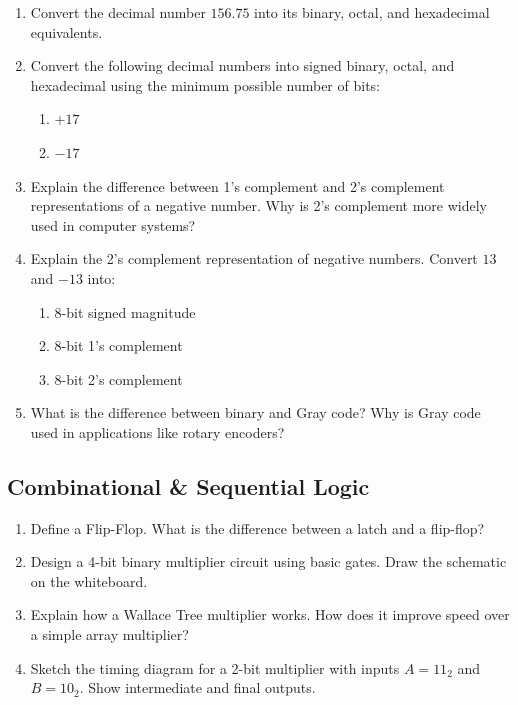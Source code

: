 \begin{enumerate}[label=\textbf{D\arabic*.}, leftmargin=*, itemsep=6pt]

  \item Convert the decimal number $156.75$ into its binary, octal, and
        hexadecimal equivalents.

  \item Convert the following decimal numbers into signed binary, octal, and
        hexadecimal using the minimum possible number of bits:
        \begin{enumerate}[label=(\alph*)]
          \item $+17$
          \item $-17$
        \end{enumerate}

  \item Explain the difference between 1's complement and 2's complement
        representations of a negative number. Why is 2's complement more widely
        used in computer systems?

  \item Explain the 2's complement representation of negative numbers. Convert
        $13$ and $-13$ into:
        \begin{enumerate}[label=(\alph*)]
          \item 8-bit signed magnitude
          \item 8-bit 1's complement
          \item 8-bit 2's complement
        \end{enumerate}

  \item What is the difference between binary and Gray code? Why is Gray code
        used in applications like rotary encoders?

\end{enumerate}

\subsection{Combinational \& Sequential Logic}

\begin{enumerate}[label=\textbf{D\arabic*.}, leftmargin=*, itemsep=6pt, start=6]

  \item Define a Flip-Flop. What is the difference between a latch and a
        flip-flop?

  \item Design a 4-bit binary multiplier circuit using basic gates. Draw the
        schematic on the whiteboard.

  \item Explain how a Wallace Tree multiplier works. How does it improve speed
        over a simple array multiplier?

  \item Sketch the timing diagram for a 2-bit multiplier with inputs $A = 11_2$
        and $B = 10_2$. Show intermediate and final outputs.

\end{enumerate}

